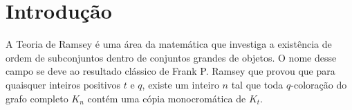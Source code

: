 \documentclass[12pt,a4paper]{book}
\begin{document}



\tableofcontents    %

\listoffigures            

\mainmatter

\fancyhead[RE,LO]{\thesection}

\onehalfspacing            %




\chapter{Introdução}
\label{sec:intro}


A Teoria de Ramsey é uma área da matemática que investiga a existência de ordem de subconjuntos dentro de conjuntos grandes de objetos.
O nome desse campo se deve ao resultado clássico de Frank P. Ramsey \cite{Ra} que provou que para quaisquer inteiros positivos $t$ e $q$, existe um inteiro $n$ tal que toda $q$-coloração do grafo completo $K_n$ contém uma cópia monocromática de $K_t$.
\end{document}
